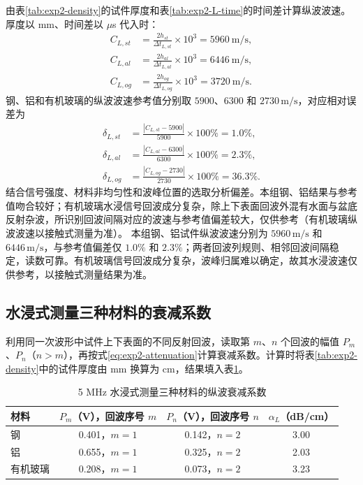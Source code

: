 \documentclass[UTF8,a4paper,12pt]{ctexart}
\numberwithin{equation}{section}
\begin{document}
由表\ref{tab:exp2-density}的试件厚度和表\ref{tab:exp2-L-time}的时间差计算纵波波速。厚度以 mm、时间差以 $\mu$s 代入时：
\begin{subequations}
\begin{align}
  C_{L,st}&=\frac{2h_{st}}{\Delta t_{L,st}}\times10^3
  =5960\ \mathrm{m/s},\\
  C_{L,al}&=\frac{2h_{al}}{\Delta t_{L,al}}\times10^3
  =6446\ \mathrm{m/s},\\
  C_{L,og}&=\frac{2h_{og}}{\Delta t_{L,og}}\times10^3
  =3720\ \mathrm{m/s}.
\end{align}
\end{subequations}
钢、铝和有机玻璃的纵波波速参考值分别取 $5900$、$6300$ 和 $2730\,\mathrm{m/s}$，对应相对误差为
\begin{subequations}
\begin{align}
  \delta_{L,st}&=\frac{|C_{L,st}-5900|}{5900}\times100\%=1.0\%,\\
  \delta_{L,al}&=\frac{|C_{L,al}-6300|}{6300}\times100\%=2.3\%,\\
  \delta_{L,og}&=\frac{|C_{L,og}-2730|}{2730}\times100\%=36.3\%.
\end{align}
\end{subequations}
结合信号强度、材料非均匀性和波峰位置的选取分析偏差。本组钢、铝结果与参考值吻合较好；有机玻璃水浸信号回波成分复杂，除上下表面回波外混有水面与盆底反射杂波，所识别回波间隔对应的波速与参考值偏差较大，仅供参考（有机玻璃纵波波速以接触式测量为准）。
本组钢、铝试件纵波波速分别为 $5960\,\mathrm{m/s}$ 和 $6446\,\mathrm{m/s}$，与参考值偏差仅 $1.0\%$ 和 $2.3\%$；两者回波列规则、相邻回波间隔稳定，读数可靠。有机玻璃信号回波成分复杂，波峰归属难以确定，故其水浸波速仅供参考，以接触式测量结果为准。

\subsection{水浸式测量三种材料的衰减系数}
利用同一次波形中试件上下表面的不同反射回波，读取第 $m$、$n$ 个回波的幅值 $P_m$、$P_n$（$n>m$），再按式\eqref{eq:exp2-attenuation}计算衰减系数。计算时将表\ref{tab:exp2-density}中的试件厚度由 mm 换算为 cm，结果填入表\ref{tab:exp2-attenuation}。

\begin{table}[H]
\centering
\caption{5 MHz 水浸式测量三种材料的纵波衰减系数}
\label{tab:exp2-attenuation}
\begin{tabular}{lccc}
\toprule
材料 & $P_m$（V），回波序号 $m$ & $P_n$（V），回波序号 $n$ & $\alpha_L$（dB/cm）\\
\midrule
钢 & 0.401，$m=1$ & 0.142，$n=2$ & 3.00\\
铝 & 0.655，$m=1$ & 0.325，$n=2$ & 2.03\\
有机玻璃 & 0.208，$m=1$ & 0.073，$n=2$ & 3.23\\
\bottomrule
\end{tabular}
\end{table}
\end{document}
